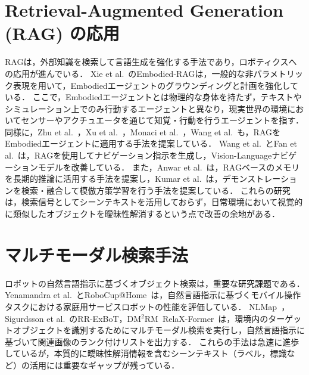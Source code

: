 \section{Retrieval-Augmented Generation (RAG) の応用}
RAGは，外部知識を検索して言語生成を強化する手法であり，ロボティクスへの応用が進んでいる．
Xie et al.~\cite{xie2025embodiedrag}のEmbodied-RAGは，一般的な非パラメトリック表現を用いて，Embodiedエージェントのグラウンディングと計画を強化している．
ここで，Embodiedエージェントとは物理的な身体を持たず，テキストやシミュレーション上でのみ行動するエージェントと異なり，現実世界の環境においてセンサーやアクチュエータを通じて知覚・行動を行うエージェントを指す．
同様に，Zhu et al.~\cite{zhu2024raea}，Xu et al.~\cite{xu2024prag}，Monaci et al.~\cite{monaci2025rana}，Wang et al.~\cite{wang2025rag6dpose}も，RAGをEmbodiedエージェントに適用する手法を提案している．
Wang et al.~\cite{wang2025navrag}とFan et al.~\cite{fan2024bevinstructor}は，RAGを使用してナビゲーション指示を生成し，Vision-Languageナビゲーションモデルを改善している．
また，Anwar et al.~\cite{anwar2025remembr}は，RAGベースのメモリを長期的推論に活用する手法を提案し，Kumar et al.~\cite{kumar2025collage}は，デモンストレーションを検索・融合して模倣方策学習を行う手法を提案している．
これらの研究は，検索信号としてシーンテキストを活用しておらず，日常環境において視覚的に類似したオブジェクトを曖昧性解消するという点で改善の余地がある．

\section{マルチモーダル検索手法}
ロボットの自然言語指示に基づくオブジェクト検索は，重要な研究課題である．
Yenamandra et al.~\cite{Yenamandra2023HomeRobotOM}とRoboCup@Home~\cite{robocup}は，自然言語指示に基づくモバイル操作タスクにおける家庭用サービスロボットの性能を評価している．
NLMap~\cite{nlmap}，Sigurdsson et al.~\cite{Sigurdsson2023RRExBoTRR}のRR-ExBoT，DM$^2$RM~\cite{dm2rm}RelaX-Former~\cite{relaxformer}は，環境内のターゲットオブジェクトを識別するためにマルチモーダル検索を実行し，自然言語指示に基づいて関連画像のランク付けリストを出力する．
これらの手法は急速に進歩しているが，本質的に曖昧性解消情報を含むシーンテキスト（ラベル，標識など）の活用には重要なギャップが残っている．

